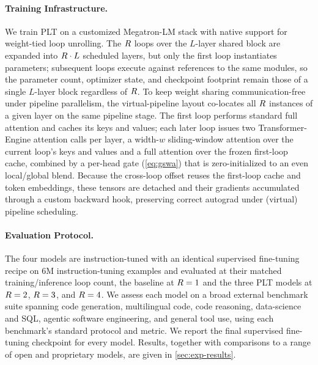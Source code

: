 \paragraph{Training Infrastructure.}
\label{sec:exp-infra}
We train PLT on a customized Megatron-LM stack with native support for
weight-tied loop unrolling.
The $R$ loops over the $L$-layer shared block are expanded into
$R\cdot L$ scheduled layers, but only the first loop instantiates
parameters; subsequent loops execute against references to the same modules, so
the parameter count, optimizer state, and checkpoint footprint remain those of a
single $L$-layer block regardless of $R$.
To keep weight sharing communication-free under pipeline parallelism, the
virtual-pipeline layout co-locates all $R$ instances of a given layer on
the same pipeline stage.
The first loop performs standard full attention and caches its keys and values;
each later loop issues two Transformer-Engine attention calls per layer, a
width-$w$ sliding-window attention over the current loop's keys and values and a
full attention over the frozen first-loop cache, combined by a per-head gate
(\autoref{eq:gswa}) that is zero-initialized to an even local/global blend.
Because the cross-loop offset reuses the first-loop cache and token embeddings,
these tensors are detached and their gradients accumulated through a custom
backward hook, preserving correct autograd under (virtual) pipeline scheduling.

\paragraph{Evaluation Protocol.}
\label{sec:exp-eval}

The four models are instruction-tuned with an identical supervised
fine-tuning recipe on 6M instruction-tuning examples and evaluated at their
matched training/inference loop
count, the baseline at $R = 1$ and the three PLT models at
$R = 2$, $R = 3$, and $R = 4$.
We assess each model on a broad external benchmark suite spanning code
generation, multilingual code, code reasoning, data-science and SQL, agentic
software engineering, and general tool use, using each benchmark's standard
protocol and metric.
We report the final supervised fine-tuning checkpoint for every model. Results,
together with comparisons to a range of open and proprietary models, are given
in \autoref{sec:exp-results}.

